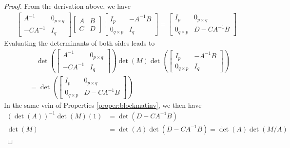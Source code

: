 \begin{proof}
From the derivation above, we have
\begin{align*}
\begin{bmatrix}
A^{-1} & 0_{p\times q} \\
-CA^{-1} & I_q
\end{bmatrix}
\begin{bmatrix}
A & B \\
C & D
\end{bmatrix}
\begin{bmatrix}
I_p & -A^{-1}B \\
0_{q \times p} & I_q
\end{bmatrix} 
=
\begin{bmatrix}
I_p & 0_{p \times q} \\
0_{q\times p} & D - CA^{-1}B 
\end{bmatrix}
\end{align*}
Evaluating the determinants of both sides leads to
\begin{align*}
&\quad \det(\begin{bmatrix}
A^{-1} & 0_{p\times q} \\
-CA^{-1} & I_q
\end{bmatrix})
\det(M)
\det(\begin{bmatrix}
I_p & -A^{-1}B \\
0_{q \times p} & I_q
\end{bmatrix}) \\
&=
\det(\begin{bmatrix}
I_p & 0_{p \times q} \\
0_{q\times p} & D - CA^{-1}B 
\end{bmatrix})
\end{align*}
In the same vein of Properties \ref{proper:blockmatinv}, we then have
\begin{align*}
(\det(A))^{-1}\det(M)(1) &= \det(D-CA^{-1}B) \\
\det(M) &= \det(A)\det(D-CA^{-1}B) = \det(A)\det(M/A)
\end{align*}
\end{proof}

